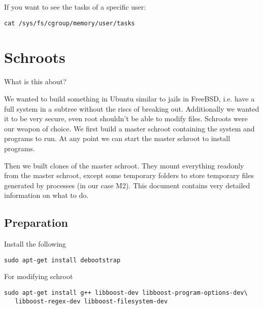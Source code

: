 \documentclass[a4paper]{book}
\begin{document}
If you want to see the tasks of a specific user:
\begin{verbatim}
cat /sys/fs/cgroup/memory/user/tasks
\end{verbatim}

\chapter{Schroots}
What is this about?

We wanted to build something in Ubuntu similar to jails in FreeBSD, i.e. have a
full system in a subtree without the riscs of breaking out.  Additionally we
wanted it to be very secure, even root shouldn't be able to modify files.
Schroots were our weapon of choice. We first build a master schroot containing
the system and programs to run. At any point we can start the master schroot to
install programs.

Then we built clones of the master schroot. They mount everything readonly from
the master schroot, except some temporary folders to store temporary files
generated by processes (in our case M2). This document contains very detailed
information on what to do.

\section{Preparation}

Install the following

\begin{verbatim}
sudo apt-get install debootstrap
\end{verbatim}

For modifying schroot

\begin{verbatim}
sudo apt-get install g++ libboost-dev libboost-program-options-dev\
   libboost-regex-dev libboost-filesystem-dev
\end{verbatim}
\end{document}
